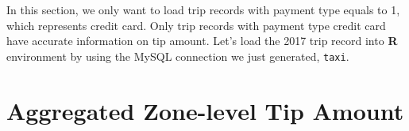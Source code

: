 \documentclass[12pt,twoside]{reedthesis}
\newenvironment{Shaded}{\begin{snugshade}}{\end{snugshade}}
\newcommand{\KeywordTok}[1]{\textcolor[rgb]{0.13,0.29,0.53}{\textbf{#1}}}
\newcommand{\DecValTok}[1]{\textcolor[rgb]{0.00,0.00,0.81}{#1}}
\newcommand{\StringTok}[1]{\textcolor[rgb]{0.31,0.60,0.02}{#1}}
\newcommand{\CommentTok}[1]{\textcolor[rgb]{0.56,0.35,0.01}{\textit{#1}}}
\newcommand{\OperatorTok}[1]{\textcolor[rgb]{0.81,0.36,0.00}{\textbf{#1}}}
\newcommand{\NormalTok}[1]{#1}
\theoremstyle{definition}
\theoremstyle{definition}
\theoremstyle{definition}
\theoremstyle{remark}
\begin{document}
In this section, we only want to load trip records with payment type
equals to 1, which represents credit card. Only trip records with
payment type credit card have accurate information on tip amount. Let's
load the 2017 trip record into \textbf{R} environment by using the MySQL
connection we just generated, \texttt{taxi}.
\begin{Shaded}
\end{Shaded}
\section{Aggregated Zone-level Tip
Amount}\label{aggregated-zone-level-tip-amount}
\end{document}
